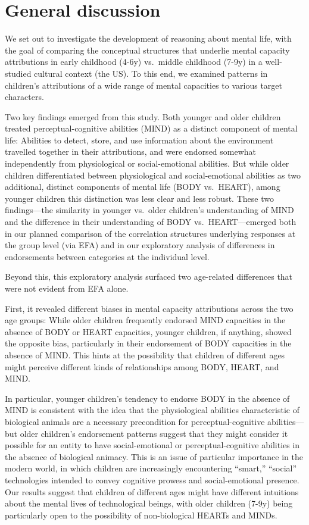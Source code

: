 \documentclass[10pt, letterpaper]{article}
\begin{document}
\section{General discussion}\label{general-discussion}

We set out to investigate the development of reasoning about mental
life, with the goal of comparing the conceptual structures that underlie
mental capacity attributions in early childhood (4-6y) vs.~middle
childhood (7-9y) in a well-studied cultural context (the US). To this
end, we examined patterns in children's attributions of a wide range of
mental capacities to various target characters.

Two key findings emerged from this study. Both younger and older
children treated perceptual-cognitive abilities (MIND) as a distinct
component of mental life: Abilities to detect, store, and use
information about the environment travelled together in their
attributions, and were endorsed somewhat independently from
physiological or social-emotional abilities. But while older children
differentiated between physiological and social-emotional abilities as
two additional, distinct components of mental life (BODY vs.~HEART),
among younger children this distinction was less clear and less robust.
These two findings---the similarity in younger vs.~older children's
understanding of MIND and the difference in their understanding of BODY
vs.~HEART---emerged both in our planned comparison of the correlation
structures underlying responses at the group level (via EFA) and in our
exploratory analysis of differences in endorsements between categories
at the individual level.

Beyond this, this exploratory analysis surfaced two age-related
differences that were not evident from EFA alone.

First, it revealed different biases in mental capacity attributions
across the two age groups: While older children frequently endorsed MIND
capacities in the absence of BODY or HEART capacities, younger children,
if anything, showed the opposite bias, particularly in their endorsement
of BODY capacities in the absence of MIND. This hints at the possibility
that children of different ages might perceive different kinds of
relationships among BODY, HEART, and MIND.

In particular, younger children's tendency to endorse BODY in the
absence of MIND is consistent with the idea that the physiological
abilities characteristic of biological animals are a necessary
precondition for perceptual-cognitive abilities---but older children's
endorsement patterns suggest that they might consider it possible for an
entity to have social-emotional or perceptual-cognitive abilities in the
absence of biological animacy. This is an issue of particular importance
in the modern world, in which children are increasingly encountering
``smart,'' ``social'' technologies intended to convey cognitive prowess
and social-emotional presence. Our results suggest that children of
different ages might have different intuitions about the mental lives of
technological beings, with older children (7-9y) being particularly open
to the possibility of non-biological HEARTs and MINDs.
\end{document}
